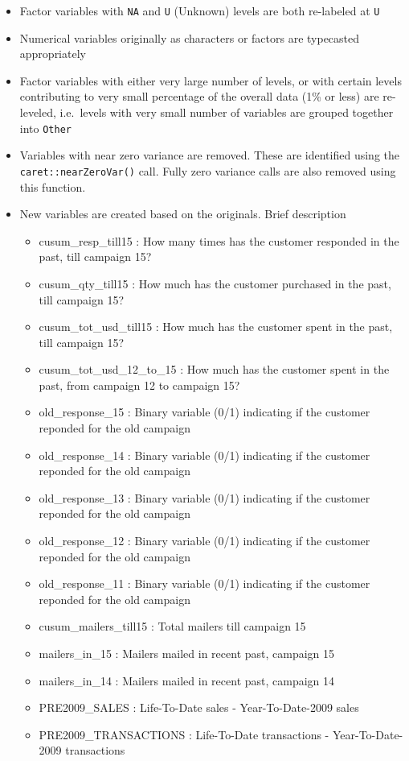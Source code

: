 \documentclass[10pt,]{article}
\providecommand{\tightlist}{%
  \setlength{\itemsep}{0pt}\setlength{\parskip}{0pt}}
\begin{document}
\begin{itemize}
\tightlist
\item
  Factor variables with \texttt{NA} and \texttt{U} (Unknown) levels are
  both re-labeled at \texttt{U}
\item
  Numerical variables originally as characters or factors are typecasted
  appropriately
\item
  Factor variables with either very large number of levels, or with
  certain levels contributing to very small percentage of the overall
  data (1\% or less) are re-leveled, i.e.~levels with very small number
  of variables are grouped together into \texttt{Other}
\item
  Variables with near zero variance are removed. These are identified
  using the \texttt{caret::nearZeroVar()} call. Fully zero variance
  calls are also removed using this function.
\item
  New variables are created based on the originals. Brief description

  \begin{itemize}
  \tightlist
  \item
    cusum\_resp\_till15 : How many times has the customer responded in
    the past, till campaign 15?
  \item
    cusum\_qty\_till15 : How much has the customer purchased in the
    past, till campaign 15?
  \item
    cusum\_tot\_usd\_till15 : How much has the customer spent in the
    past, till campaign 15?
  \item
    cusum\_tot\_usd\_12\_to\_15 : How much has the customer spent in the
    past, from campaign 12 to campaign 15?
  \item
    old\_response\_15 : Binary variable (0/1) indicating if the customer
    reponded for the old campaign
  \item
    old\_response\_14 : Binary variable (0/1) indicating if the customer
    reponded for the old campaign
  \item
    old\_response\_13 : Binary variable (0/1) indicating if the customer
    reponded for the old campaign
  \item
    old\_response\_12 : Binary variable (0/1) indicating if the customer
    reponded for the old campaign
  \item
    old\_response\_11 : Binary variable (0/1) indicating if the customer
    reponded for the old campaign
  \item
    cusum\_mailers\_till15 : Total mailers till campaign 15
  \item
    mailers\_in\_15 : Mailers mailed in recent past, campaign 15
  \item
    mailers\_in\_14 : Mailers mailed in recent past, campaign 14
  \item
    PRE2009\_SALES : Life-To-Date sales - Year-To-Date-2009 sales
  \item
    PRE2009\_TRANSACTIONS : Life-To-Date transactions -
    Year-To-Date-2009 transactions
  \end{itemize}
\end{itemize}
\end{document}
